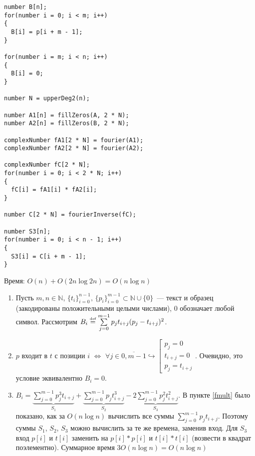\documentclass[a4paper]{article}
\def\eqdef{\overset{\mbox{\tiny def}}{=}}
\newcommand{\NN}{\mathbb{N}}
\begin{document}
\begin{enumerate}
\begin{enumerate}
\begin{lstlisting}
number B[n];
for(number i = 0; i < m; i++)
{
  B[i] = p[i + m - 1];
}

for(number i = m; i < n; i++)
{
  B[i] = 0;
}

number N = upperDeg2(n);

number A1[n] = fillZeros(A, 2 * N);
number A2[n] = fillZeros(B, 2 * N);

complexNumber fA1[2 * N] = fourier(A1);
complexNumber fA2[2 * N] = fourier(A2);

complexNumber fC[2 * N];
for(number i = 0; i < 2 * N; i++)
{
  fC[i] = fA1[i] * fA2[i];
}

number C[2 * N] = fourierInverse(fC);

number S3[n];
for(number i = 0; i < n - 1; i++)
{
  S3[i] = C[i + m - 1];
}
\end{lstlisting}
Время: $O(n) + O(2n\log 2n)=O(n\log n)$
\end{enumerate}
\end{enumerate}
\begin{enumerate}
\item Пусть $m,n\in\NN$, $\{t_i\}_{i=0}^{n-1},\,\{p_i\}_{i=0}^{m-1}\subset \NN\cup\{0\}$~--- текст и образец (закодированы положительными целыми числами), $0$ обозначает любой символ. Рассмотрим $B_i\eqdef\sum\limits_{j=0}^{m-1}p_jt_{i+j}(p_j-t_{i+j})^2$.
\item $p$ входит в $t$ с позиции $i$ $\Leftrightarrow$ $\forall j\in\overline{0,m-1}\hookrightarrow \left[
\begin{array}{l}
p_j=0\\
t_{i+j}=0\\
p_j=t_{i+j}
\end{array}
\right.$. Очевидно, это условие эквивалентно $B_i=0$.
\item $B_i=\underbrace{\sum\limits_{j=0}^{m-1}p_j^3t_{i+j}}_{S_1}+\underbrace{\sum\limits_{j=0}^{m-1}p_jt^3_{i+j}}_{S_2}-\underbrace{2\sum\limits_{j=0}^{m-1}p_j^2t_{i+j}^2}_{S_3}$. В пункте \ref{fmult} было показано, как за $O(n\log n)$ вычислить все суммы $\sum\limits_{j=0}^{m-1}p_jt_{i+j}$. Поэтому суммы $S_1$, $S_2$, $S_3$ можно вычислить за те же времена, заменив вход. Для $S_3$ вход $p[i]$ и $t[i]$ заменить на $p[i] * p[i]$ и $t[i] * t[i]$ (возвести в квадрат поэлементно). Суммарное время $3O(n\log n)=O(n\log n)$
\end{enumerate}
\newpage
\end{document}
